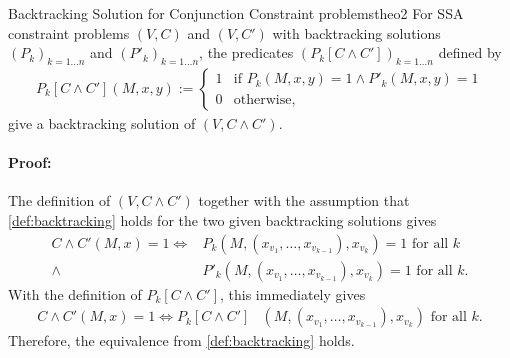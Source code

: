 \begin{theorem}{Backtracking Solution for Conjunction Constraint problems}{theo2}
    For SSA constraint problems $(V,C)$ and $(V,C')$ with backtracking
    solutions $(P_k)_{k=1\dots n}$ and $(P'_k)_{k=1\dots n}$, the
    predicates $(P_k[C\mathrel\land C'])_{k=1\dots n}$ defined by
    \begin{align*}
        P_k[C\mathrel\land C'](M,x,y):=\left\{
            \begin{array}{ll}
                1&\text{if }P_k(M,x,y)=1\mathrel\land P'_k(M,x,y)=1\\
                0&\text{otherwise},
            \end{array}\right.
    \end{align*}
    give a backtracking solution of $(V,C\mathrel\land C')$.
    \tcblower
    \paragraph*{Proof:}
    The definition of $(V,C\mathrel\land C')$ together with the
    assumption that \autoref{def:backtracking} holds for the two given
    backtracking solutions gives
    \begin{align*}
        C\mathrel\land C'(M,x)=1\iff{}& P_k(M,(x_{v_1},\dots,x_{v_{k-1}}),x_{v_k})=1\text{ for all }k\\
                              \mathrel\land{}& P'_k(M,(x_{v_1},\dots,x_{v_{k-1}}),x_{v_k})=1\text{ for all }k.
    \end{align*}
    With the definition of $P_k[C\mathrel\land C']$, this immediately gives
    \begin{align*}
        C\mathrel\land C'(M,x)=1\iff P_k[C\mathrel\land C']&(M,(x_{v_1},\dots,x_{v_{k-1}}),x_{v_k})\text{ for all }k.
    \end{align*}
    Therefore, the equivalence from \autoref{def:backtracking} holds.
\end{theorem}
